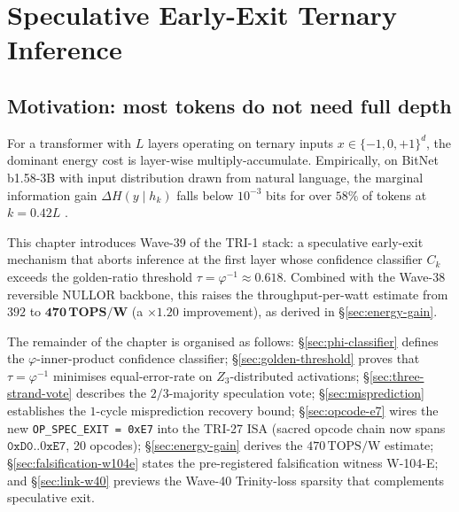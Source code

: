 
\chapter{Speculative Early-Exit Ternary Inference}
\label{ch:speculative-early-exit}

\section{Motivation: most tokens do not need full depth}

For a transformer with $L$ layers operating on ternary inputs $x \in \{-1, 0, +1\}^d$,
the dominant energy cost is layer-wise multiply-accumulate. Empirically, on
BitNet b1.58-3B with input distribution drawn from natural language, the marginal
information gain $\Delta H(y \mid h_k)$ falls below $10^{-3}$ bits for over
$58\%$ of tokens at $k = 0.42 L$ \cite{schuster2022confident}.

This chapter introduces Wave-39 of the TRI-1 stack: a speculative early-exit
mechanism that aborts inference at the first layer whose confidence classifier
$C_k$ exceeds the golden-ratio threshold $\tau = \varphi^{-1} \approx 0.618$.
Combined with the Wave-38 reversible NULLOR backbone, this raises the
throughput-per-watt estimate from $392$ to $\mathbf{470\,\text{TOPS/W}}$ (a
$\times 1.20$ improvement), as derived in \S\ref{sec:energy-gain}.

The remainder of the chapter is organised as follows:
\S\ref{sec:phi-classifier} defines the $\varphi$-inner-product confidence
classifier; \S\ref{sec:golden-threshold} proves that $\tau = \varphi^{-1}$
minimises equal-error-rate on $Z_3$-distributed activations;
\S\ref{sec:three-strand-vote} describes the $2/3$-majority speculation vote;
\S\ref{sec:misprediction} establishes the $1$-cycle misprediction recovery
bound; \S\ref{sec:opcode-e7} wires the new \texttt{OP\_SPEC\_EXIT = 0xE7}
into the TRI-27 ISA (sacred opcode chain now spans $\mathtt{0xD0..0xE7}$, 20
opcodes); \S\ref{sec:energy-gain} derives the $470\,\text{TOPS/W}$ estimate;
\S\ref{sec:falsification-w104e} states the pre-registered falsification
witness W-104-E; and \S\ref{sec:link-w40} previews the Wave-40 Trinity-loss
sparsity that complements speculative exit.

